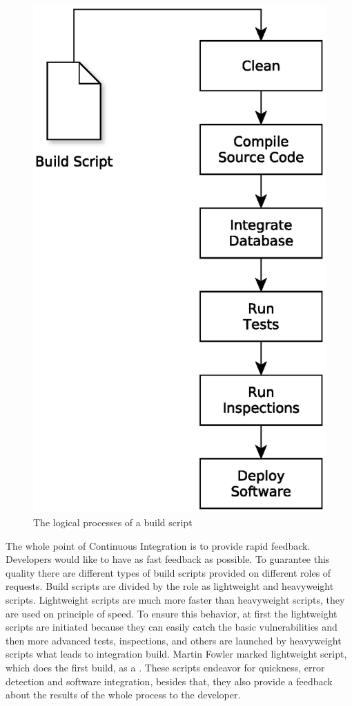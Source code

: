 \begin{figure}[H]
	\centering
	\includegraphics[scale=0.5]{yEd/the_logical_processes_of_a_build_script.eps}
	\caption{The logical processes of a build script\cite{CIbook}}
	\label{fig:lpobs}
\end{figure}

The whole point of Continuous Integration is to provide rapid feedback\cite{MartinFowler}. Developers would like to have as fast feedback as possible. To guarantee this quality there are different types of build scripts provided on different roles of requests. Build scripts are divided by the role as lightweight and heavyweight scripts. Lightweight scripts are much more faster than heavyweight scripts, they are used on principle of speed. To ensure this behavior, at first the lightweight scripts are initiated because they can easily catch the basic vulnerabilities and then more advanced tests, inspections, and others are launched by heavyweight scripts what leads to integration build. Martin Fowler marked lightweight script, which does the first build, as a \cite{MartinFowler}. These scripts endeavor for quickness, error detection and software integration, besides that, they also provide a feedback about the results of the whole process to the developer.


